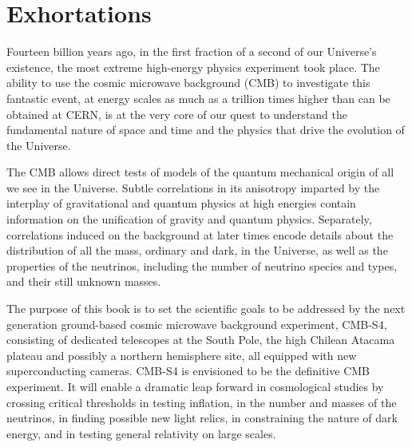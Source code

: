  
\chapter{Exhortations}
\label{chap:intro}






Fourteen billion years ago, in the first fraction of a second of our Universe's existence, the most extreme high-energy physics experiment took place. The ability to use the cosmic microwave background (CMB) to investigate this fantastic event, at energy scales as much as a trillion times higher than can be obtained at CERN, is at the very core of our quest to understand the fundamental nature of space and time and the physics that drive the evolution of the Universe. 

The CMB allows direct tests of models of the quantum mechanical origin of all we see in the Universe. Subtle correlations in its anisotropy imparted by the interplay of gravitational and quantum physics at high energies contain information on the unification of gravity and quantum physics. Separately, correlations induced on the background at later times encode details about the distribution of all the mass, ordinary and dark, in the Universe, as well as the properties of the neutrinos, including the number of neutrino species and types, and their still unknown masses. 

The purpose of this book is to set the scientific goals to be addressed by the next generation ground-based cosmic microwave background experiment, CMB-S4, consisting of dedicated telescopes at the South Pole, the high Chilean Atacama plateau and possibly a northern hemisphere site, all equipped with new superconducting cameras. CMB-S4 
is envisioned to be the definitive CMB experiment. It will enable a dramatic leap forward in cosmological studies by crossing critical thresholds in testing inflation, in the number and masses of the neutrinos, in finding possible new light relics, in  constraining the nature of dark energy, and in testing general relativity on large scales. 

